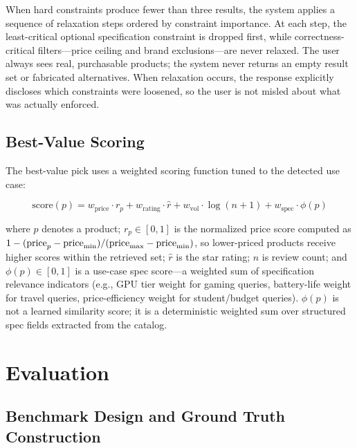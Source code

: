 \documentclass[sigconf,anonymous]{acmart}
\begin{document}
When hard constraints produce fewer than three results, the system
applies a sequence of relaxation steps ordered by constraint importance.
At each step, the least-critical optional specification constraint is dropped
first, while correctness-critical filters---price ceiling and brand
exclusions---are never relaxed.
The user always sees real, purchasable products; the system never returns an
empty result set or fabricated alternatives.
When relaxation occurs, the response explicitly discloses which constraints
were loosened, so the user is not misled about what was actually enforced.

\subsection{Best-Value Scoring}

The best-value pick uses a weighted scoring function tuned to the detected
use case:

\begin{equation}
\text{score}(p) = w_{\text{price}} \cdot r_p +
                  w_{\text{rating}} \cdot \hat{r} +
                  w_{\text{vol}} \cdot \log(n+1) +
                  w_{\text{spec}} \cdot \phi(p)
\end{equation}

where $p$ denotes a product; $r_p \in [0,1]$ is the normalized price score
computed as $1 - ({\rm price}_p - {\rm price}_{\min}) / ({\rm price}_{\max} -
{\rm price}_{\min})$, so lower-priced products receive higher scores within
the retrieved set; $\hat{r}$ is the star rating; $n$ is review count; and
$\phi(p) \in [0,1]$ is a use-case spec score---a weighted sum of
specification relevance indicators (e.g., GPU tier weight for gaming queries,
battery-life weight for travel queries, price-efficiency weight for
student/budget queries). $\phi(p)$ is not a learned similarity score; it is
a deterministic weighted sum over structured spec fields extracted from the catalog.

\section{Evaluation}

\subsection{Benchmark Design and Ground Truth Construction}
\label{sec:evaluation}
\end{document}

